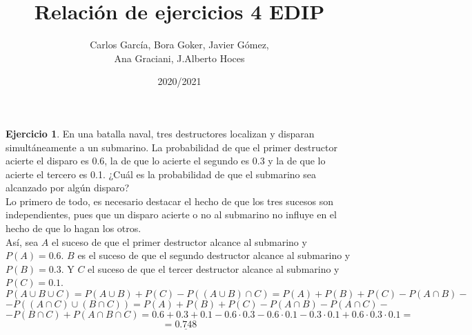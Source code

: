 \documentclass[a4paper, 12pt]{article}
\title{\textbf{Relación de ejercicios 4 EDIP}}
\author{Carlos García, Bora Goker, Javier Gómez,  \\ Ana Graciani, J.Alberto Hoces}
\date{2020/2021}
\theoremstyle{definition}
\newtheorem{ej}{Ejercicio}
\begin{document}
\maketitle

\begin{ej}
En una batalla naval, tres destructores localizan y disparan simultáneamente a un submarino. La probabilidad de que el primer destructor acierte el disparo es 0.6, la de que lo acierte el segundo es 0.3 y la de que lo acierte el tercero es 0.1. ¿Cuál es la probabilidad de que el submarino sea alcanzado por algún disparo? \\

Lo primero de todo, es necesario destacar el hecho de que los tres sucesos son independientes, pues que un disparo acierte o no al submarino no influye en el hecho de que lo hagan los otros. \\

Así, sea \(A\) el suceso de que el primer destructor alcance al submarino y \(P(A) = 0.6\). \(B\) es el suceso de que el segundo destructor alcance al submarino y \(P(B) = 0.3\). Y \(C\) el suceso de que el tercer destructor alcance al submarino y \(P(C) = 0.1\).
\[
	P(A \cup B \cup C) = P(A \cup B) + P(C) - P((A \cup B) \cap C) = P(A) + P(B) + P(C) - P(A \cap B) -
\]
\[
	- P((A\cap C) \cup (B \cap C)) = P(A) + P(B) + P(C) - P(A \cap B) - P(A \cap C) - 
\]
\[
	- P(B \cap C) + P(A \cap B \cap C) = 0.6 + 0.3 + 0.1 - 0.6 \cdot 0.3 - 0.6 \cdot 0.1 - 0.3 \cdot 0.1 + 0.6 \cdot 0.3 \cdot 0.1 =
\]
\[
	= \underline{0.748}
\]

\end{ej}
\end{document}
